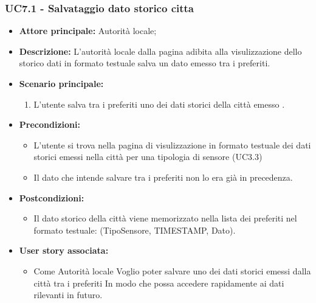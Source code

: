 \subsubsection{UC7.1 - Salvataggio dato storico citta}
\begin{itemize}
    \item \textbf{Attore principale:} Autorità locale;
    \item \textbf{Descrizione:} L’autorità locale dalla pagina adibita alla visulizzazione dello storico dati in formato testuale salva un dato emesso tra i preferiti.
    \item \textbf{Scenario principale:}
          \begin{enumerate}
              \item L'utente salva tra i preferiti uno dei dati storici della città emesso .
          \end{enumerate}
    \item \textbf{Precondizioni:}
          \begin{itemize}
              \item  L'utente si trova nella pagina di visulizzazione in formato testuale dei dati storici emessi nella città per una tipologia di sensore (UC3.3)
              \item  Il dato che intende salvare tra i preferiti non lo era già in precedenza.
          \end{itemize}
    \item \textbf{Postcondizioni:}
          \begin{itemize}
              \item  Il dato storico della città viene memorizzato nella lista dei preferiti nel
                    formato testuale: (TipoSensore,
                    TIMESTAMP, Dato).
          \end{itemize}
    \item \textbf{User story associata:}
          \begin{itemize}
              \item Come Autorità locale
                    Voglio poter salvare uno dei dati storici emessi dalla città tra i preferiti
                    In modo che possa accedere rapidamente ai dati rilevanti in futuro.
          \end{itemize}
\end{itemize}